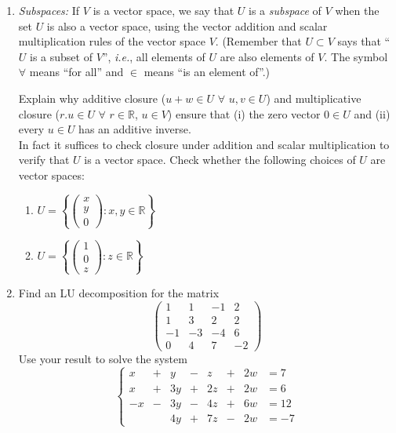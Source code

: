 \begin{enumerate}
\begin{enumerate}
\item $V = \{ \textrm{polynomials with complex coefficients of degree $\leq 3$} \}$, with usual addition and scalar multiplication of polynomials.

\item $V = \{ \textrm{vectors in $\mathbb{R}^3$ with at least one entry containing a 1}\}$, with usual addition and scalar multiplication.
\end{enumerate}


\item
{\itshape Subspaces:} If $V$ is a vector space, we say that $U$ is a {\itshape subspace} of $V$ when the set $U$ is also a vector space,
using the vector addition and scalar multiplication rules of the vector space $V$. 
(Remember that $U\subset V$  says that  ``$U$ is a subset of $V$'', {\itshape i.e.}, all elements of $U$
are also elements of $V$. The symbol $\forall$ means ``for all'' and $\in$ means ``is an element of''.)

\noindent
Explain why additive closure ($u+w\in U$ $\forall$ $u,v\in U$) and multiplicative closure ($r.u\in U$ $\forall$ $r\in \mathbb R$, $u\in V$) 
ensure that (i) the zero vector $0\in U$ and (ii) every $u\in U$ has an additive inverse.\\[2mm]

\noindent
In fact it suffices to check closure under addition and scalar multiplication to verify that $U$ is a vector space. Check whether the following
choices of $U$ are vector spaces:
\begin{enumerate}
\item
$U=\left\{\begin{pmatrix}x\\y\\0\end{pmatrix}:x,y\in \mathbb R\right\}$
\item
$U=\left\{\begin{pmatrix}1\\0\\z\end{pmatrix}:z\in \mathbb R\right\}$
\end{enumerate}

\item
Find an LU decomposition for the matrix 
\[
\begin{pmatrix}
1&1&-1&2\\
1&3&2&2\\
-1&-3&-4&6\\
0&4&7&-2
\end{pmatrix}
\]
Use your result to solve the system
\[
\left\{
\begin{array}{cccccccc}
x&+&y&-&z&+&2w&=7\\[1mm]
x&+&3y&+&2z&+&2w&=6\\[1mm]
-x&-&3y&-&4z&+&6w&=12\\[1mm]
&&4y&+&7z&-&2w&=-7
\end{array}
\right.
\]

\end{enumerate}

